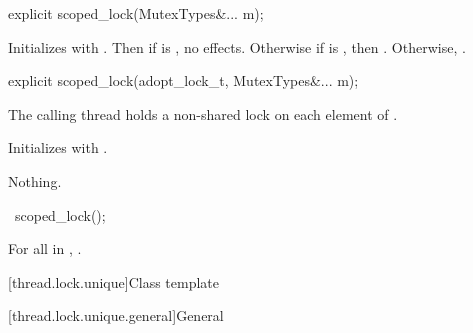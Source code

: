 %
\begin{itemdecl}
explicit scoped_lock(MutexTypes&... m);
\end{itemdecl}

\begin{itemdescr}
\pnum
\effects
Initializes  with .
Then if  is , no effects.
Otherwise if  is , then .
Otherwise, .
\end{itemdescr}

%
\begin{itemdecl}
explicit scoped_lock(adopt_lock_t, MutexTypes&... m);
\end{itemdecl}

\begin{itemdescr}
\pnum
\expects
The calling thread holds a non-shared lock on each element of .

\pnum
\effects
Initializes  with .

\pnum
\throws
Nothing.
\end{itemdescr}

%
\begin{itemdecl}
~scoped_lock();
\end{itemdecl}

\begin{itemdescr}
\pnum
\effects
For all  in ,
.
\end{itemdescr}

[thread.lock.unique]{Class template }

[thread.lock.unique.general]{General}

